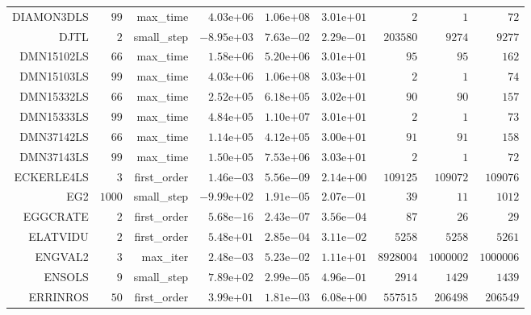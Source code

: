 \begin{longtable}{rrrrrrrrr}
DIAMON3DLS & \(    99\) & max\_time & \( 4.03\)e\(+06\) & \( 1.06\)e\(+08\) & \( 3.01\)e\(+01\) & \(     2\) & \(     1\) & \(    72\) \\
DJTL & \(     2\) & small\_step & \(-8.95\)e\(+03\) & \( 7.63\)e\(-02\) & \( 2.29\)e\(-01\) & \(203580\) & \(  9274\) & \(  9277\) \\
DMN15102LS & \(    66\) & max\_time & \( 1.58\)e\(+06\) & \( 5.20\)e\(+06\) & \( 3.01\)e\(+01\) & \(    95\) & \(    95\) & \(   162\) \\
DMN15103LS & \(    99\) & max\_time & \( 4.03\)e\(+06\) & \( 1.06\)e\(+08\) & \( 3.03\)e\(+01\) & \(     2\) & \(     1\) & \(    74\) \\
DMN15332LS & \(    66\) & max\_time & \( 2.52\)e\(+05\) & \( 6.18\)e\(+05\) & \( 3.02\)e\(+01\) & \(    90\) & \(    90\) & \(   157\) \\
DMN15333LS & \(    99\) & max\_time & \( 4.84\)e\(+05\) & \( 1.10\)e\(+07\) & \( 3.01\)e\(+01\) & \(     2\) & \(     1\) & \(    73\) \\
DMN37142LS & \(    66\) & max\_time & \( 1.14\)e\(+05\) & \( 4.12\)e\(+05\) & \( 3.00\)e\(+01\) & \(    91\) & \(    91\) & \(   158\) \\
DMN37143LS & \(    99\) & max\_time & \( 1.50\)e\(+05\) & \( 7.53\)e\(+06\) & \( 3.03\)e\(+01\) & \(     2\) & \(     1\) & \(    72\) \\
ECKERLE4LS & \(     3\) & first\_order & \( 1.46\)e\(-03\) & \( 5.56\)e\(-09\) & \( 2.14\)e\(+00\) & \(109125\) & \(109072\) & \(109076\) \\
EG2 & \(  1000\) & small\_step & \(-9.99\)e\(+02\) & \( 1.91\)e\(-05\) & \( 2.07\)e\(-01\) & \(    39\) & \(    11\) & \(  1012\) \\
EGGCRATE & \(     2\) & first\_order & \( 5.68\)e\(-16\) & \( 2.43\)e\(-07\) & \( 3.56\)e\(-04\) & \(    87\) & \(    26\) & \(    29\) \\
ELATVIDU & \(     2\) & first\_order & \( 5.48\)e\(+01\) & \( 2.85\)e\(-04\) & \( 3.11\)e\(-02\) & \(  5258\) & \(  5258\) & \(  5261\) \\
ENGVAL2 & \(     3\) & max\_iter & \( 2.48\)e\(-03\) & \( 5.23\)e\(-02\) & \( 1.11\)e\(+01\) & \(8928004\) & \(1000002\) & \(1000006\) \\
ENSOLS & \(     9\) & small\_step & \( 7.89\)e\(+02\) & \( 2.99\)e\(-05\) & \( 4.96\)e\(-01\) & \(  2914\) & \(  1429\) & \(  1439\) \\
ERRINROS & \(    50\) & first\_order & \( 3.99\)e\(+01\) & \( 1.81\)e\(-03\) & \( 6.08\)e\(+00\) & \(557515\) & \(206498\) & \(206549\) \\

\end{longtable}
